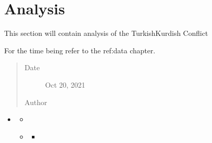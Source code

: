 \documentclass[letterpaper,10pt,english]{sphinxmanual}
\begin{document}
\chapter{Analysis}
\label{\detokenize{analysis:analysis}}\label{\detokenize{analysis:analysis-chapter}}\label{\detokenize{analysis::doc}}
\begin{sphinxShadowBox}

\sphinxAtStartPar
This section will contain analysis of the Turkish\sphinxhyphen{}Kurdish Conflict

\sphinxAtStartPar
For the time being refer to the ref:data chapter.
\begin{quote}\begin{description}
\item[{Date}] \leavevmode
\sphinxAtStartPar
Oct 20, 2021

\item[{Author}] \leavevmode
\sphinxAtStartPar
{}

\end{description}\end{quote}
\end{sphinxShadowBox}

\begin{sphinxShadowBox}
\begin{itemize}
\item {} 
\sphinxAtStartPar
{}\label{\detokenize{analysis:id2}}{\hyperref[\detokenize{analysis:analysis}]{}}
\begin{itemize}
\item {} 
\sphinxAtStartPar
{}\label{\detokenize{analysis:id3}}{\hyperref[\detokenize{analysis:current-data}]{}}

\item {} 
\sphinxAtStartPar
{}\label{\detokenize{analysis:id4}}{\hyperref[\detokenize{analysis:archived-data}]{}}
\begin{itemize}
\item {} 
\sphinxAtStartPar
{}\label{\detokenize{analysis:id5}}{\hyperref[\detokenize{analysis:id1}]{}}

\end{itemize}

\end{itemize}

\end{itemize}
\end{sphinxShadowBox}
\end{document}

